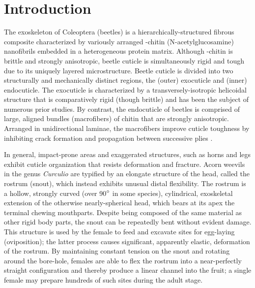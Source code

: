 \documentclass[twocolumn, linenumbers, superscriptaddress]{revtex4-1}
\begin{document}
\section*{Introduction} 
	{The exoskeleton of Coleoptera (beetles) is a hierarchically-structured fibrous composite characterized by variously arranged \textalpha-chitin (N-acetylglucosamine) nanofibrils embedded in a heterogeneous protein matrix.
	Although \textalpha-chitin is brittle and strongly anisotropic, beetle cuticle is simultaneously rigid and tough due to its uniquely layered microstructure.
	Beetle cuticle is divided into two structurally and mechanically distinct regions, the (outer) exocuticle and (inner) endocuticle.
	The exocuticle is characterized by a transversely-isotropic helicoidal structure that is comparatively rigid (though brittle) and has been the subject of numerous prior studies.
	By contrast, the endocuticle of beetles is comprised of large, aligned bundles (macrofibers) of chitin that are strongly anisotropic.
	Arranged in unidirectional laminae, the macrofibers improve cuticle toughness by inhibiting crack formation and propagation between successive plies \cite{Kamp2010,Kamp2015,Hepburn1973}.
	
	In general, impact-prone areas and exaggerated structures, such as horns and legs exhibit cuticle organization that resists deformation and fracture.
	Acorn weevils in the genus \textit{Curculio} are typified by an elongate structure of the head, called the rostrum (snout), which instead exhibits unusual distal flexibility.
	The rostrum is a hollow, strongly curved (over 90$\degree$ in some species), cylindrical, exoskeletal extension of the otherwise nearly-spherical head, which bears at its apex the terminal chewing mouthparts.
	Despite being composed of the same material as other rigid body parts, the snout can be repeatedly bent without evident damage.
	This structure is used by the female to feed and excavate sites for egg-laying (oviposition); the latter process causes significant, apparently elastic, deformation of the rostrum.
	By maintaining constant tension on the snout and rotating around the bore-hole, females are able to flex the rostrum into a near-perfectly straight configuration and thereby produce a linear channel into the fruit; a single female may prepare hundreds of such sites during the adult stage.
	
}
\end{document}
